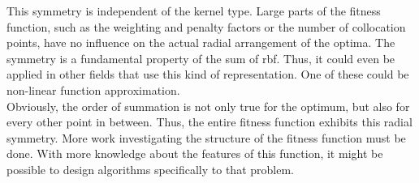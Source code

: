 \documentclass[./\jobname.tex]{subfiles}
\begin{document}
\begin{figure}[h]
	\centering
	\noindent{}
	\label{fig:optima_distribution}
\end{figure}
This symmetry is independent of the kernel type. Large parts of the fitness function, such as the weighting and penalty factors or the number of collocation points, have no influence on the actual radial arrangement of the optima. The symmetry is a fundamental property of the sum of \gls{rbf}. Thus, it could even be applied in other fields that use this kind of representation. One of these could be non-linear function approximation. \\ Obviously, the order of summation is not only true for the optimum, but also for every other point in between. Thus, the entire fitness function exhibits this radial symmetry. More work investigating the structure of the fitness function must be done. With more knowledge about the features of this function, it might be possible to design algorithms specifically to that problem. 
\end{document}
